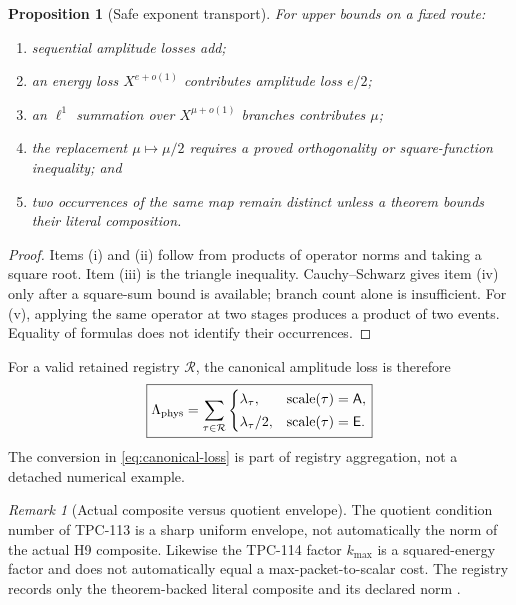 \documentclass[11pt]{article}
\newtheorem{proposition}[theorem]{Proposition}
\theoremstyle{definition}
\theoremstyle{remark}
\newtheorem{remark}[theorem]{Remark}
\begin{document}
\begin{proposition}[Safe exponent transport]
\label{prop:transport}
For upper bounds on a fixed route:
\begin{enumerate}[label=(\roman*),leftmargin=2em]
\item sequential amplitude losses add;
\item an energy loss \(X^{e+o(1)}\) contributes amplitude loss
  \(e/2\);
\item an \(\ell^1\) summation over \(X^{\mu+o(1)}\) branches
  contributes \(\mu\);
\item the replacement \(\mu\mapsto\mu/2\) requires a proved
  orthogonality or square-function inequality; and
\item two occurrences of the same map remain distinct unless a
  theorem bounds their literal composition.
\end{enumerate}
\end{proposition}

\begin{proof}
Items (i) and (ii) follow from products of operator norms and taking a
square root.  Item (iii) is the triangle inequality.  Cauchy--Schwarz
gives item (iv) only after a square-sum bound is available; branch
count alone is insufficient.  For (v), applying the same operator at
two stages produces a product of two events.  Equality of formulas
does not identify their occurrences.
\end{proof}

For a valid retained registry \(\mathcal R\), the canonical amplitude
loss is therefore
\begin{equation}
 \boxed{
 \Lambda_{\rm phys}
 =
 \sum_{\tau\in\mathcal R}
 \begin{cases}
  \lambda_\tau,&\mathrm{scale}(\tau)=\mathsf A,\\[0.2em]
  \lambda_\tau/2,&\mathrm{scale}(\tau)=\mathsf E.
 \end{cases}}
\label{eq:canonical-loss}
\end{equation}
The conversion in \eqref{eq:canonical-loss} is part of registry
aggregation, not a detached numerical example.

\begin{remark}[Actual composite versus quotient envelope]
The quotient condition number of TPC-113 is a sharp uniform envelope,
not automatically the norm of the actual H9 composite.  Likewise the
TPC-114 factor \(k_{\max}\) is a squared-energy factor and does not
automatically equal a max-packet-to-scalar cost.  The registry records
only the theorem-backed literal composite and its declared norm
\citep{WangTPC113,WangTPC114}.
\end{remark}
\end{document}
